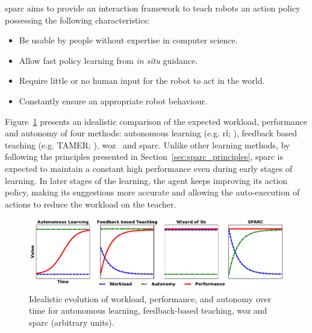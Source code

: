 \gls{sparc} aims to provide an interaction framework to teach robots an action policy possessing the following characteristics:
\begin{itemize}
	\item Be usable by people without expertise in computer science.
	\item Allow fast policy learning from \textit{in situ} guidance.
	\item Require little or no human input for the robot to act in the world.
	\item Constantly ensure an appropriate robot behaviour.
\end{itemize}

Figure~\ref{fig:concept} presents an idealistic comparison of the expected workload, performance and autonomy of four methods: autonomous learning (e.g. \gls{rl}; \citealt{sutton1998reinforcement}), feedback based teaching (e.g. TAMER; \citealt{knox2009interactively}), \gls{woz}~\citep{riek2012wizard} and \gls{sparc}. Unlike other learning methods, by following the principles presented in Section~\ref{sec:sparc_principles}, \gls{sparc} is expected to maintain a constant high performance even during early stages of learning. In later stages of the learning, the agent keeps improving its action policy, making its suggestions more accurate and allowing the auto-execution of actions to reduce the workload on the teacher.

\begin{figure}[ht]
	\includegraphics[width=1\linewidth]{concept.pdf}
	\centering
	\caption{Idealistic evolution of workload, performance, and autonomy over time for autonomous learning, feedback-based teaching, \gls{woz} and \gls{sparc} (arbitrary units).}
	\label{fig:concept}
\end{figure}

